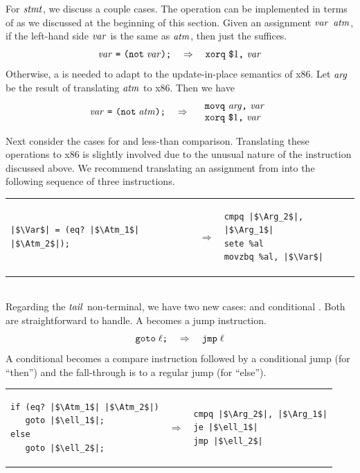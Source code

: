 \documentclass[11pt]{book}
\begin{document}
For $\mathit{stmt}$, we discuss a couple cases.  The  operation can
be implemented in terms of  as we discussed at the
beginning of this section. Given an assignment
$\mathit{var}$ \key{=}  $\mathit{atm}$\key{);},
if the left-hand side $\mathit{var}$ is
the same as $\mathit{atm}$, then just the  suffices.
\[
\mathit{var}~\texttt{=}~ \texttt{(not}\; \mathit{var}\texttt{);}
\quad\Rightarrow\quad
\texttt{xorq}~\texttt{\$}1\texttt{,}~\mathit{var}
\]
Otherwise, a  is needed to adapt to the update-in-place
semantics of x86. Let $\mathit{arg}$ be the result of translating $\mathit{atm}$ to
x86. Then we have
\[
\mathit{var}~\texttt{=}~ \texttt{(not}\; \mathit{atm}\texttt{);}
\quad\Rightarrow\quad
\begin{array}{l}
\texttt{movq}~\mathit{arg}\texttt{,}~\mathit{var}\\
\texttt{xorq}~\texttt{\$}1\texttt{,}~\mathit{var}
\end{array}
\]

Next consider the cases for  and less-than comparison.
Translating these operations to x86 is slightly involved due to the
unusual nature of the  instruction discussed above.  We
recommend translating an assignment from  into the following
sequence of three instructions. \\
\begin{tabular}{lll}
\begin{minipage}{0.4\textwidth}
\begin{lstlisting}
|$\Var$| = (eq? |$\Atm_1$| |$\Atm_2$|);
\end{lstlisting}
\end{minipage}
&
$\Rightarrow$
&
\begin{minipage}{0.4\textwidth}
\begin{lstlisting}
cmpq |$\Arg_2$|, |$\Arg_1$|
sete %al
movzbq %al, |$\Var$|
\end{lstlisting}
\end{minipage}
\end{tabular}  \\

Regarding the $\mathit{tail}$ non-terminal, we have two new cases: 
and conditional . Both are straightforward to handle. A
 becomes a jump instruction.
\[
\texttt{goto}\; \ell\texttt{;} \quad \Rightarrow \quad \texttt{jmp}\;\ell
\]
A conditional  becomes a compare instruction followed
by a conditional jump (for ``then'') and the fall-through is
to a regular jump (for ``else'').\\
\begin{tabular}{lll}
\begin{minipage}{0.4\textwidth}
\begin{lstlisting}
if (eq? |$\Atm_1$| |$\Atm_2$|)
   goto |$\ell_1$|;
else
   goto |$\ell_2$|;
\end{lstlisting}
\end{minipage}
&
$\Rightarrow$
&
\begin{minipage}{0.4\textwidth}
\begin{lstlisting}
cmpq |$\Arg_2$|, |$\Arg_1$|
je |$\ell_1$|
jmp |$\ell_2$|
\end{lstlisting}
\end{minipage}
\end{tabular}  \\
\end{document}
